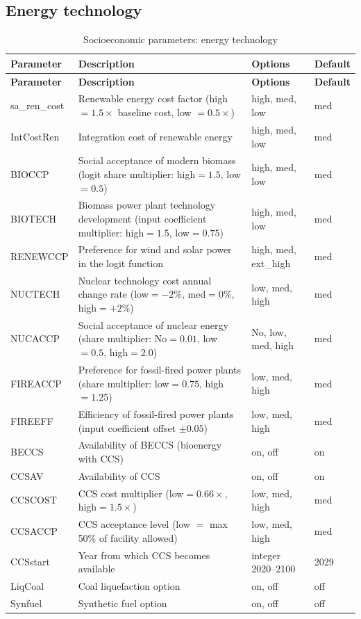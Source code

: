 \documentclass[10pt,a4paper,titlepage,dvipdfmx]{book}
\begin{document}
\subsection{Energy technology}
\begin{longtable}{|p{}|p{}|p{}|p{}|}
\caption{Socioeconomic parameters: energy technology}\label{tab:sp-soc-entech}\\
\hline
\textbf{Parameter} & \textbf{Description} & \textbf{Options} & \textbf{Default} \\ \hline
\endfirsthead
\hline
\textbf{Parameter} & \textbf{Description} & \textbf{Options} & \textbf{Default} \\ \hline
\endhead
\hline
\endfoot
sa\_ren\_cost & Renewable energy cost factor (high $=1.5\times$ baseline cost, low $=0.5\times$) & high, med, low & med \\ \hline
IntCostRen & Integration cost of renewable energy & high, med, low & med \\ \hline
BIOCCP & Social acceptance of modern biomass (logit share multiplier: high$=1.5$, low$=0.5$) & high, med, low & med \\ \hline
BIOTECH & Biomass power plant technology development (input coefficient multiplier: high$=1.5$, low$=0.75$) & high, med, low & med \\ \hline
RENEWCCP & Preference for wind and solar power in the logit function & high, med, ext\_high & med \\ \hline
NUCTECH & Nuclear technology cost annual change rate (low$=-2\%$, med$=0\%$, high$=+2\%$) & low, med, high & med \\ \hline
NUCACCP & Social acceptance of nuclear energy (share multiplier: No$=0.01$, low$=0.5$, high$=2.0$) & No, low, med, high & med \\ \hline
FIREACCP & Preference for fossil-fired power plants (share multiplier: low$=0.75$, high$=1.25$) & low, med, high & med \\ \hline
FIREEFF & Efficiency of fossil-fired power plants (input coefficient offset $\pm0.05$) & low, med, high & med \\ \hline
BECCS & Availability of BECCS (bioenergy with CCS) & on, off & on \\ \hline
CCSAV & Availability of CCS & on, off & on \\ \hline
CCSCOST & CCS cost multiplier (low$=0.66\times$, high$=1.5\times$) & low, med, high & med \\ \hline
CCSACCP & CCS acceptance level (low $=$ max 50\% of facility allowed) & low, med, high & med \\ \hline
CCSstart & Year from which CCS becomes available & integer 2020--2100 & 2029 \\ \hline
LiqCoal & Coal liquefaction option & on, off & off \\ \hline
Synfuel & Synthetic fuel option & on, off & off \\ \hline
\end{longtable}
\end{document}
